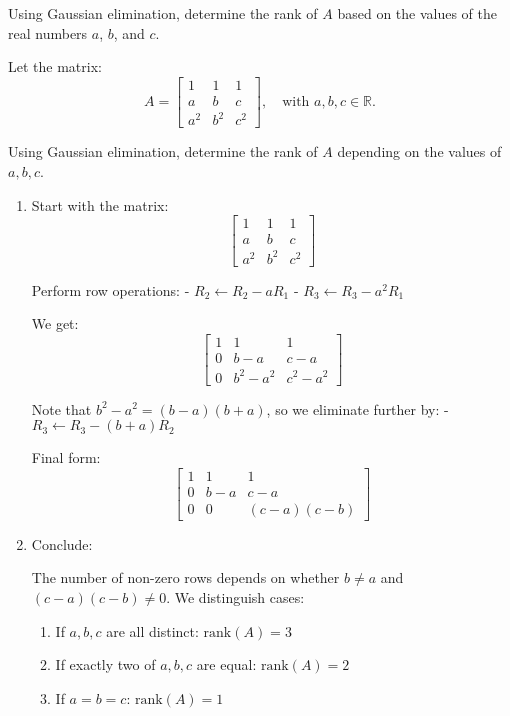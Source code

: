 \documentclass[12pt]{article}
\begin{document}
Using Gaussian elimination, determine the rank of $A$ based on the values of the real numbers $a$, $b$, and $c$.

\newpage

\begin{answerbox}
    Let the matrix:
    $$
    A = 
    \begin{bmatrix}
    1 & 1 & 1 \\
    a & b & c \\
    a^2 & b^2 & c^2
    \end{bmatrix}, \quad \text{with } a, b, c \in \mathbb{R}.
    $$
    
    Using Gaussian elimination, determine the rank of $ A $ depending on the values of $ a, b, c $.
    
    \begin{enumerate}
    \item Start with the matrix:
    $$
    \begin{bmatrix}
    1 & 1 & 1 \\
    a & b & c \\
    a^2 & b^2 & c^2
    \end{bmatrix}
    $$
    
    Perform row operations:
    - $ R_2 \leftarrow R_2 - a R_1 $
    - $ R_3 \leftarrow R_3 - a^2 R_1 $
    
    We get:
    $$
    \begin{bmatrix}
    1 & 1 & 1 \\
    0 & b - a & c - a \\
    0 & b^2 - a^2 & c^2 - a^2
    \end{bmatrix}
    $$
    
    Note that $ b^2 - a^2 = (b - a)(b + a) $, so we eliminate further by:
    - $ R_3 \leftarrow R_3 - (b + a) R_2 $
    
    Final form:
    $$
    \begin{bmatrix}
    1 & 1 & 1 \\
    0 & b - a & c - a \\
    0 & 0 & (c - a)(c - b)
    \end{bmatrix}
    $$
    
    \item Conclude:
    
    The number of non-zero rows depends on whether $ b \ne a $ and $ (c - a)(c - b) \ne 0 $. We distinguish cases:
    
    \begin{enumerate}
        \item If $ a, b, c $ are all distinct: $ \boxed{\mathrm{rank}(A) = 3} $
        \item If exactly two of $ a, b, c $ are equal: $ \boxed{\mathrm{rank}(A) = 2} $
        \item If $ a = b = c $: $ \boxed{\mathrm{rank}(A) = 1} $
    \end{enumerate}
    \end{enumerate}
\end{answerbox}

\end{document}
